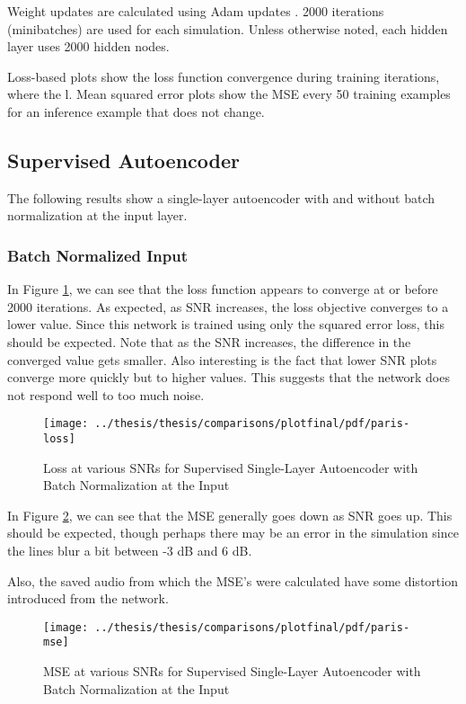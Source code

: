 Weight updates are calculated using Adam updates \cite{DBLP:journals/corr/KingmaB14}. 2000 iterations (minibatches) are used for each simulation. Unless otherwise noted, each hidden layer uses 2000 hidden nodes.

Loss-based plots show the loss function convergence during training iterations, where the l. Mean squared error plots show the MSE every 50 training examples for an inference example that does not change.

\subsection{Supervised Autoencoder}

The following results show a single-layer autoencoder with and without batch normalization at the input layer.

\subsubsection{Batch Normalized Input}

In Figure \ref{fig:paris-bn-loss}, we can see that the loss function appears to converge at or before 2000 iterations. As expected, as SNR increases, the loss objective converges to a lower value. Since this network is trained using only the squared error loss, this should be expected. Note that as the SNR increases, the difference in the converged value gets smaller. Also interesting is the fact that lower SNR plots converge more quickly but to higher values. This suggests that the network does not respond well to too much noise.

\begin{figure}[!ht]
\centering
\texttt{[image: ../thesis/thesis/comparisons/plotfinal/pdf/paris-loss]}
\caption{Loss at various SNRs for Supervised Single-Layer Autoencoder with Batch Normalization at the Input}\label{fig:paris-bn-loss}
\end{figure}

In Figure \ref{fig:paris-bn-mse}, we can see that the MSE generally goes down as SNR goes up. This should be expected, though perhaps there may be an error in the simulation since the lines blur a bit between -3 dB and 6 dB.

Also, the saved audio from which the MSE's were calculated have some distortion introduced from the network.

\begin{figure}[!ht]
\centering
\texttt{[image: ../thesis/thesis/comparisons/plotfinal/pdf/paris-mse]}
\caption{MSE at various SNRs for Supervised Single-Layer Autoencoder with Batch Normalization at the Input}\label{fig:paris-bn-mse}
\end{figure}

